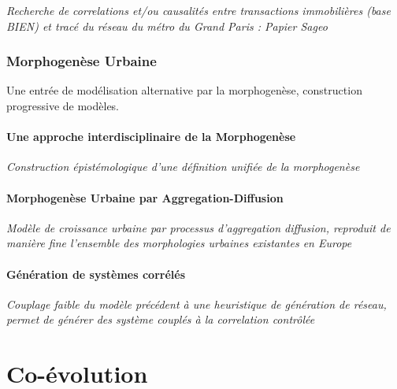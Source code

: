 \textit{Recherche de correlations et/ou causalités entre transactions immobilières (base BIEN) et tracé du réseau du métro du Grand Paris : Papier Sageo}






\section{Morphogenèse Urbaine}

{\color{blue}Une entrée de modélisation alternative par la morphogenèse, construction progressive de modèles.}

\subsection{Une approche interdisciplinaire de la Morphogenèse}

\textit{Construction épistémologique d'une définition unifiée de la morphogenèse~\cite{antelope2016interdisciplinary}}


\subsection{Morphogenèse Urbaine par Aggregation-Diffusion}

\textit{Modèle de croissance urbaine par processus d'aggregation diffusion, reproduit de manière fine l'ensemble des morphologies urbaines existantes en Europe} 


\subsection{Génération de systèmes corrélés}

\textit{Couplage faible du modèle précédent à une heuristique de génération de réseau, permet de générer des système couplés à la correlation contrôlée~\cite{raimbault2016generation}}





\part{Co-évolution}

